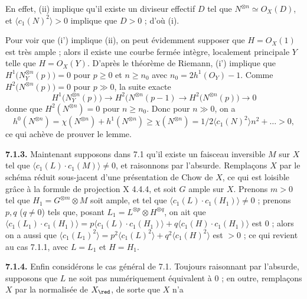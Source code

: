 
En
effet, (ii) implique qu'il existe un diviseur effectif $D$ tel que $N^{\otimes n}\simeq{O}_X(D)$, et $\langle c_1(N)^2\rangle>0$ implique que $D>0$ ; d'o\`u (i).

Pour voir que (i') implique (ii), on peut \'evidemment supposer que $H={O}_X(1)$ est tr\`es ample ; alors il existe une courbe ferm\'ee int\`egre, localement principale $Y$ telle que $H={O}_X(Y)$. D'apr\`es le th\'eor\`eme de Riemann, (i') implique que $H^1\bigl(N_Y^{\otimes n}(p)\bigr)=0$ pour $p\geq0$ et $n\geq n_0$ avec $n_0=2h^1({O}_Y)-1$. Comme $H^2\bigl(N^{\otimes n}(p)\bigr)=0$ pour $p\gg0$, la suite exacte
\[
   H^1\bigl(N_Y^{\otimes n}(p)\bigr)
   \longrightarrow H^2\bigl(N^{\otimes n}(p-1)
   \longrightarrow H^2\bigl(N^{\otimes n}(p)\bigr)
   \longrightarrow0
\]
donne que $H^2(N^{\otimes n})=0$ pour $n\geq n_0$. Donc pour $n\gg0$, on a
\[
   h^0(N^{\otimes n})
   =\chi(N^{\otimes n})+h^1(N^{\otimes n})
   \geq\chi(N^{\otimes n})
   =1/2\langle c_1(N)^2\rangle n^2+\ldots>0,
\]
ce qui ach\`eve de prouver le lemme.

\textbf{7.1.3.} Maintenant supposons dans 7.1 qu'il existe un faisceau inversible $M$ sur $X$ tel que $\langle c_1(L)\cdot c_1(M)\rangle\ne0$, et raisonnons par l'absurde. Rempla\c{c}ons $X$ par le sch\'ema r\'eduit sous-jacent d'une pr\'esentation de Chow de $X$, ce qui est loisible gr\^ace \`a la formule de projection X 4.4.4, et soit $G$ ample sur $X$. Prenons $m>0$ tel que $H_1=G^{\otimes m}\otimes M$ soit ample, et tel que $\langle c_1(L)\cdot c_1(H_1)\rangle\ne0$ ; prenons $p,q$ ($q\ne0$) tels que, posant $L_1=L^{\otimes p}\otimes H^{\otimes q}$, on ait que $\langle c_1(L_1)\cdot c_1(H_1)\rangle=p\langle c_1(L)\cdot c_1(H_1)\rangle+q\langle c_1(H)\cdot c_1(H_1)\rangle$ est $0$ ; alors on a aussi que $\langle c_1(L_1)^2\rangle=p^2\langle c_1(L)^2\rangle+q^2\langle c_1(H)^2\rangle$ est $>0$ ; ce qui revient au cas 7.1.1, avec $L=L_1$ et $H=H_1$.

\textbf{7.1.4.} Enfin consid\'erons le cas g\'en\'eral de 7.1. Toujours raisonnant par l'absurde, supposons que $L$ ne soit pas num\'eriquement \'equivalent \`a $0$ ; en outre, rempla\c{c}ons $X$ par la normalis\'ee de $X_{\red}$, de sorte que $X$ n'a 
